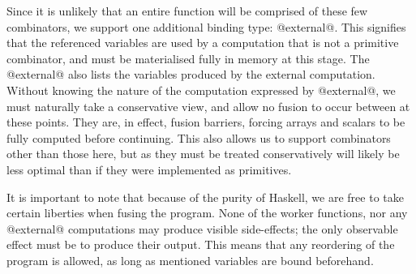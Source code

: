 Since it is unlikely that an entire function will be comprised of these few combinators, we support one additional binding type: @external@.
This signifies that the referenced variables are used by a computation that is not a primitive combinator, and must be materialised fully in memory at this stage.
The @external@ also lists the variables produced by the external computation.
Without knowing the nature of the computation expressed by @external@, we must naturally take a conservative view, and allow no fusion to occur between at these points. They are, in effect, fusion barriers, forcing arrays and scalars to be fully computed before continuing.
This also allows us to support combinators other than those here, but as they must be treated conservatively will likely be less optimal than if they were implemented as primitives.

It is important to note that because of the purity of Haskell, we are free to take certain liberties when fusing the program.
None of the worker functions, nor any @external@ computations may produce visible side-effects; the only observable effect must be to produce their output.
This means that any reordering of the program is allowed, as long as mentioned variables are bound beforehand.



